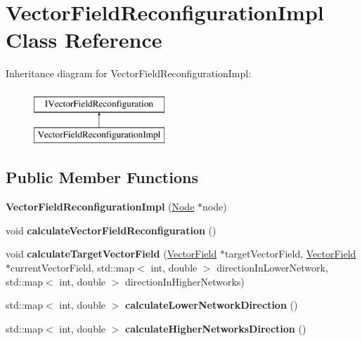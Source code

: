 \hypertarget{classVectorFieldReconfigurationImpl}{}\section{Vector\+Field\+Reconfiguration\+Impl Class Reference}
\label{classVectorFieldReconfigurationImpl}
Inheritance diagram for Vector\+Field\+Reconfiguration\+Impl\+:\begin{figure}[H]
\begin{center}
\leavevmode
\includegraphics[height=2.000000cm]{classVectorFieldReconfigurationImpl}
\end{center}
\end{figure}
\subsection*{Public Member Functions}
\begin{DoxyCompactItemize}
\item 
{\bfseries Vector\+Field\+Reconfiguration\+Impl} (\hyperlink{classNode}{Node} $\ast$node)\hypertarget{classVectorFieldReconfigurationImpl_a42670d176dfc295f342033869defc178}{}\label{classVectorFieldReconfigurationImpl_a42670d176dfc295f342033869defc178}

\item 
void {\bfseries calculate\+Vector\+Field\+Reconfiguration} ()\hypertarget{classVectorFieldReconfigurationImpl_a2143e9fc6631fb61390e8881404891a5}{}\label{classVectorFieldReconfigurationImpl_a2143e9fc6631fb61390e8881404891a5}

\item 
void {\bfseries calculate\+Target\+Vector\+Field} (\hyperlink{classVectorField}{Vector\+Field} $\ast$target\+Vector\+Field, \hyperlink{classVectorField}{Vector\+Field} $\ast$current\+Vector\+Field, std\+::map$<$ int, double $>$ direction\+In\+Lower\+Network, std\+::map$<$ int, double $>$ direction\+In\+Higher\+Networks)\hypertarget{classVectorFieldReconfigurationImpl_aae26dcd63e8c68cfac045b90e101c522}{}\label{classVectorFieldReconfigurationImpl_aae26dcd63e8c68cfac045b90e101c522}

\item 
std\+::map$<$ int, double $>$ {\bfseries calculate\+Lower\+Network\+Direction} ()\hypertarget{classVectorFieldReconfigurationImpl_ab2746d147258dc03cf7ffbbfb0abe738}{}\label{classVectorFieldReconfigurationImpl_ab2746d147258dc03cf7ffbbfb0abe738}

\item 
std\+::map$<$ int, double $>$ {\bfseries calculate\+Higher\+Networks\+Direction} ()\hypertarget{classVectorFieldReconfigurationImpl_a2e6d7b501b830cfdbf069f8b70a75a62}{}\label{classVectorFieldReconfigurationImpl_a2e6d7b501b830cfdbf069f8b70a75a62}

\end{DoxyCompactItemize}
